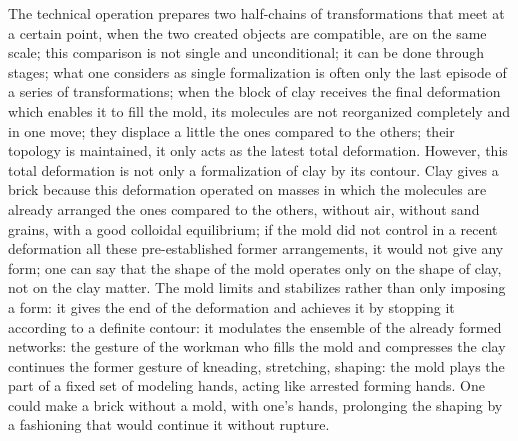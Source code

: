 \documentclass[a4paper]{article}
\begin{document}
The technical operation prepares two half-chains of transformations that meet at a certain point, when the two created objects are compatible, are on the same scale; this comparison is not single and unconditional; it can be done through stages; what one considers as single formalization is often only the last episode of a series of transformations; when the block of clay receives the final deformation which enables it to fill the mold, its molecules are not reorganized completely and in one move; they displace a little the ones compared to the others; their topology is maintained, it only acts as the latest total deformation. However, this total deformation is not only a formalization of clay by its contour. Clay gives a brick because this deformation operated on masses in which the molecules are already arranged the ones compared to the others, without air, without sand grains, with a good colloidal equilibrium; if the mold did not control in a recent deformation all these pre-established former arrangements, it would not give any form; one can say that the shape of the mold operates only on the shape of clay, not on the clay matter. The mold limits and stabilizes rather than only imposing a form: it gives the end of the deformation and achieves it by stopping it according to a definite contour: it modulates the ensemble of the already formed networks: the gesture of the workman who fills the mold and compresses the clay continues the former gesture of kneading, stretching, shaping: the mold plays the part of a fixed set of modeling hands, acting like arrested forming hands. One could make a brick without a mold, with one’s hands, prolonging the shaping by a fashioning that would continue it without rupture.
\end{document}
